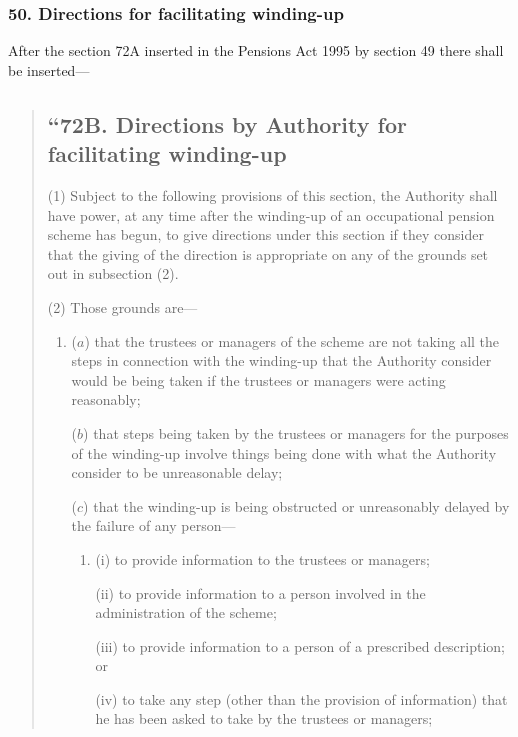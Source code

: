 \documentclass[12pt,a4paper]{article}
\begin{document}

\subsubsection{50. Directions for facilitating winding-up}

After the section 72A inserted in the Pensions Act 1995 by section 49 there shall be inserted—
\begin{quotation}
\subsection*{“72B. Directions by Authority for facilitating winding-up}

(1) Subject to the following provisions of this section, the Authority shall have power, at any time after the winding-up of an occupational pension scheme has begun, to give directions under this section if they consider that the giving of the direction is appropriate on any of the grounds set out in subsection (2).

(2) Those grounds are—
\begin{enumerate}\item[]
($a$) that the trustees or managers of the scheme are not taking all the steps in connection with the winding-up that the Authority consider would be being taken if the trustees or managers were acting reasonably;

($b$) that steps being taken by the trustees or managers for the purposes of the winding-up involve things being done with what the Authority consider to be unreasonable delay;

($c$) that the winding-up is being obstructed or unreasonably delayed by the failure of any person—
\begin{enumerate}\item[]
(i) to provide information to the trustees or managers;

(ii) to provide information to a person involved in the administration of the scheme;

(iii) to provide information to a person of a prescribed description; or

(iv) to take any step (other than the provision of information) that he has been asked to take by the trustees or managers;
\end{enumerate}


\end{enumerate}
\end{quotation}
\end{document}
